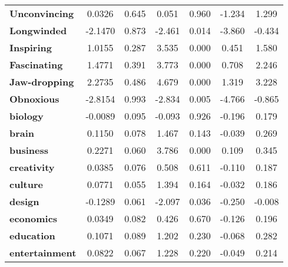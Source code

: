 \documentclass{report}
\begin{document}
\begin{center}
\begin{tabular}{lcccccc}
\textbf{Unconvincing}  &       0.0326  &        0.645     &     0.051  &         0.960        &       -1.234    &        1.299     \\
\textbf{Longwinded}    &      -2.1470  &        0.873     &    -2.461  &         0.014        &       -3.860    &       -0.434     \\
\textbf{Inspiring}     &       1.0155  &        0.287     &     3.535  &         0.000        &        0.451    &        1.580     \\
\textbf{Fascinating}   &       1.4771  &        0.391     &     3.773  &         0.000        &        0.708    &        2.246     \\
\textbf{Jaw-dropping}  &       2.2735  &        0.486     &     4.679  &         0.000        &        1.319    &        3.228     \\
\textbf{Obnoxious}     &      -2.8154  &        0.993     &    -2.834  &         0.005        &       -4.766    &       -0.865     \\
\textbf{biology}       &      -0.0089  &        0.095     &    -0.093  &         0.926        &       -0.196    &        0.179     \\
\textbf{brain}         &       0.1150  &        0.078     &     1.467  &         0.143        &       -0.039    &        0.269     \\
\textbf{business}      &       0.2271  &        0.060     &     3.786  &         0.000        &        0.109    &        0.345     \\
\textbf{creativity}    &       0.0385  &        0.076     &     0.508  &         0.611        &       -0.110    &        0.187     \\
\textbf{culture}       &       0.0771  &        0.055     &     1.394  &         0.164        &       -0.032    &        0.186     \\
\textbf{design}        &      -0.1289  &        0.061     &    -2.097  &         0.036        &       -0.250    &       -0.008     \\
\textbf{economics}     &       0.0349  &        0.082     &     0.426  &         0.670        &       -0.126    &        0.196     \\
\textbf{education}     &       0.1071  &        0.089     &     1.202  &         0.230        &       -0.068    &        0.282     \\
\textbf{entertainment} &       0.0822  &        0.067     &     1.228  &         0.220        &       -0.049    &        0.214     \\

\end{tabular}
\end{center}
\end{document}
